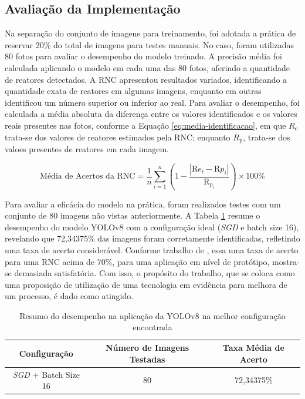\subsection{Avaliação da Implementação}

Na separação do conjunto de imagens para treinamento, foi adotada a prática de reservar 20\% do total de imagens para testes manuais. No caso, foram utilizadas 80 fotos para avaliar o desempenho do modelo treinado. A precisão média foi calculada aplicando o modelo em cada uma das 80 fotos, aferindo a quantidade de reatores detectados. A RNC apresentou resultados variados, identificando a quantidade exata de reatores em algumas imagens, enquanto em outras identificou um número superior ou inferior ao real. Para avaliar o desempenho, foi calculada a média absoluta da diferença entre os valores identificados e os valores reais presentes nas fotos, conforme a Equação \eqref{eq:media-identificacao}, em que \( R_{\text{e}} \) trata-se dos valores de reatores estimados pela RNC; enquanto \( R_{\text{p}} \), trata-se dos valoes presentes de reatores em cada imagem.

\begin{equation} \text{Média de Acertos da RNC} = \frac{1}{n} \sum_{i=1}^{n} \left(1 - \frac{|\text{R}{e_i} - \text{R}{p_i}|}{\text{R}_{p_i}}\right) \times 100\% \label{eq:media-identificacao} \end{equation}

Para avaliar a eficácia do modelo na prática, foram realizados testes com um conjunto de 80 imagens não vistas anteriormente. A Tabela \ref{tab:yolov8-eval} resume o desempenho do modelo YOLOv8 com a configuração ideal (\textit{SGD} e batch size 16), revelando que 72,34375\% das imagens foram corretamente identificadas, refletindo uma taxa de acerto considerável. Conforme trabalho de , essa uma taxa de acerto para uma RNC acima de 70\%, para uma aplicação em nível de protótipo, mostra-se demasiada satisfatória. Com isso, o propósito do trabalho, que se coloca como uma proposição de utilização de uma tecnologia em evidência para melhora de um processo, é dado como atingido. 

\begin{table}[!hbt]
    \centering
    \begin{tabular}{|c|c|c|}
        \hline
        \textbf{Configuração} & \textbf{Número de Imagens Testadas} & \textbf{Taxa Média de Acerto} \\ \hline
        \textit{SGD} + Batch Size 16 & 80 & 72,34375\% \\ \hline
    \end{tabular}
    \caption{Resumo do desempenho na aplicação da YOLOv8 na melhor configuração encontrada}
    \label{tab:yolov8-eval}
\end{table}

